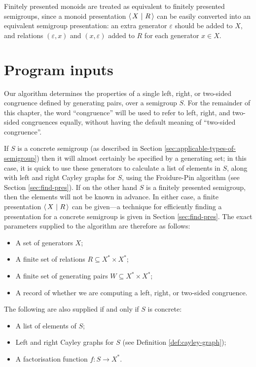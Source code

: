 Finitely presented monoids are treated as equivalent to finitely presented
semigroups, since a monoid presentation $\left\langle\,X ~\middle|~ R\,\right\rangle$ can be easily converted into
an equivalent semigroup presentation: an extra generator $\varepsilon$ should be
added to $X$, and relations $(\varepsilon,x)$ and $(x,\varepsilon)$ added to $R$
for each generator $x \in X$.

\section{Program inputs}
\label{sec:program-inputs}

Our algorithm determines the properties of a single left, right, or two-sided
congruence defined by generating pairs, over a semigroup $S$.
For the remainder of this chapter, the word ``congruence'' will be used to refer
to left, right, and two-sided congruences equally, without having the default
meaning of ``two-sided congruence''. %

If $S$ is a concrete semigroup (as described in Section
\ref{sec:applicable-types-of-semigroup}) then it will almost certainly be
specified by a generating set; in this case, it is quick to use these generators
to calculate a list of elements in $S$, along with left and right Cayley graphs
for $S$, using the Froidure-Pin algorithm (see Section \ref{sec:find-pres}).  If on the
other hand $S$ is a finitely presented semigroup, then the elements will not be
known in advance.  In either case, a finite presentation $\left\langle\,X ~\middle|~ R\,\right\rangle$ can be
given---a technique for efficiently finding a presentation for a concrete
semigroup is given in Section \ref{sec:find-pres}.
The exact parameters supplied to the algorithm are therefore as follows:
\begin{itemize}
\item A set of generators $X$;
\item A finite set of relations $R \subseteq X^* \times X^*$;
\item A finite set of generating pairs $W \subseteq X^* \times X^*$;
\item A record of whether we are computing a left, right, or two-sided
  congruence.
\end{itemize}
The following are also supplied if and only if $S$ is concrete:
\begin{itemize}
\item A list of elements of $S$;
\item Left and right Cayley graphs for $S$ (see Definition
  \ref{def:cayley-graph});
\item A factorisation function $f : S \to X^*$.
\end{itemize}

